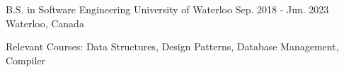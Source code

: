 

\begin{cventries}

  \cventry
    {B.S. in Software Engineering} %
    {University of Waterloo} %
    {Sep. 2018 - Jun. 2023} %
    {Waterloo, Canada} %
    {
      \begin{cvitems} %
        \item 
        {Relevant Courses: Data Structures, Design Patterns, Database Management, Compiler}
      \end{cvitems}
    }


\end{cventries}
